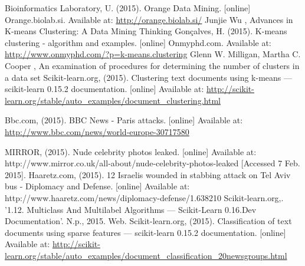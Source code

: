 \documentclass[12pt]{article}
\begin{document}
\begin{thebibliography}{99}
Bioinformatics Laboratory, U. (2015). Orange Data Mining. [online] Orange.biolab.si. Available at: \url{http://orange.biolab.si/} 
 Junjie Wu , Advances in K-means Clustering: A Data Mining Thinking
Gonçalves, H. (2015). K-means clustering - algorithm and examples. [online] Onmyphd.com. Available at: \url{http://www.onmyphd.com/?p=k-means.clustering}
    Glenn W. Milligan, Martha C. Cooper , An examination of procedures for determining the number of clusters in a data set
Scikit-learn.org, (2015). Clustering text documents using k-means — scikit-learn 0.15.2 documentation. [online] Available at: \url{http://scikit-learn.org/stable/auto_examples/document_clustering.html} 

Bbc.com, (2015). BBC News - Paris attacks. [online] Available at: \url{http://www.bbc.com/news/world-europe-30717580} 

MIRROR, (2015). Nude celebrity photos leaked. [online] Available at: http://www.mirror.co.uk/all-about/nude-celebrity-photos-leaked [Accessed 7 Feb. 2015].
 Haaretz.com, (2015). 12 Israelis wounded in stabbing attack on Tel Aviv bus - Diplomacy and Defense. [online] Available at: http://www.haaretz.com/news/diplomacy-defense/1.638210 
Scikit-learn.org,. '1.12. Multiclass And Multilabel Algorithms — Scikit-Learn 0.16.Dev Documentation'. N.p., 2015. Web. 
Scikit-learn.org, (2015). Classification of text documents using sparse features — scikit-learn 0.15.2 documentation. [online] Available at: \url{http://scikit-learn.org/stable/auto_examples/document_classification_20newsgroups.html} 
\end{thebibliography}
\end{document}
